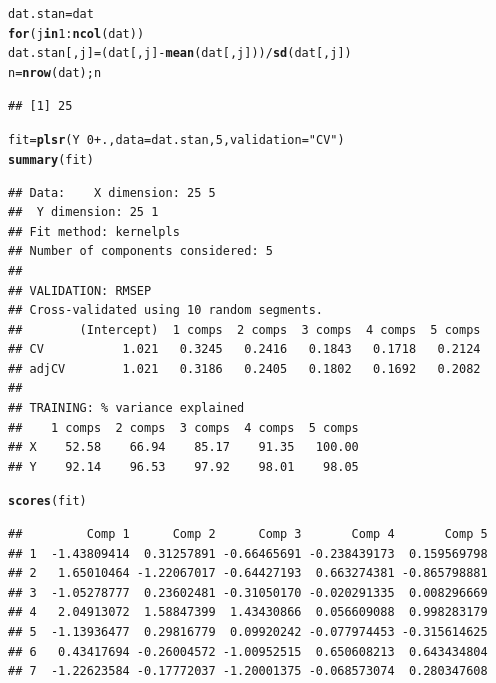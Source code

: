 \documentclass{article}\usepackage[]{graphicx}\usepackage[]{color}
\makeatletter
\newcommand{\hlnum}[1]{\textcolor[rgb]{0.686,0.059,0.569}{#1}}%
\newcommand{\hlstr}[1]{\textcolor[rgb]{0.192,0.494,0.8}{#1}}%
\newcommand{\hlopt}[1]{\textcolor[rgb]{0,0,0}{#1}}%
\newcommand{\hlstd}[1]{\textcolor[rgb]{0.345,0.345,0.345}{#1}}%
\newcommand{\hlkwa}[1]{\textcolor[rgb]{0.161,0.373,0.58}{\textbf{#1}}}%
\newcommand{\hlkwb}[1]{\textcolor[rgb]{0.69,0.353,0.396}{#1}}%
\newcommand{\hlkwc}[1]{\textcolor[rgb]{0.333,0.667,0.333}{#1}}%
\newcommand{\hlkwd}[1]{\textcolor[rgb]{0.737,0.353,0.396}{\textbf{#1}}}%
\newenvironment{kframe}{%
 \def\at@end@of@kframe{}%
 \ifinner\ifhmode%
  \def\at@end@of@kframe{\end{minipage}}%
  \begin{minipage}{\columnwidth}%
 \fi\fi%
 \def\FrameCommand##1{\hskip\@totalleftmargin \hskip-\fboxsep
 \colorbox{shadecolor}{##1}\hskip-\fboxsep
     \hskip-\linewidth \hskip-\@totalleftmargin \hskip\columnwidth}%
 \MakeFramed {\advance\hsize-\width
   \@totalleftmargin\z@ \linewidth\hsize
   \@setminipage}}%
 {\par\unskip\endMakeFramed%
 \at@end@of@kframe}
\newenvironment{knitrout}{}{} %
\makeatother
\begin{document}
\begin{enumerate}[(a)]
\begin{knitrout}
\begin{kframe}
{\ttfamily\noindent\itshape\color{messagecolor}{\#\# \\\#\# Attaching package: 'pls'\\\#\# \\\#\# The following object is masked from 'package:stats':\\\#\# \\\#\#\ \ \ \  loadings}}\begin{alltt}
  \hlstd{dat.stan} \hlkwb{=} \hlstd{dat}
  \hlkwa{for}\hlstd{(j} \hlkwa{in} \hlnum{1}\hlopt{:}\hlkwd{ncol}\hlstd{(dat))}
    \hlstd{dat.stan[,j]} \hlkwb{=} \hlstd{(dat[,j]} \hlopt{-} \hlkwd{mean}\hlstd{(dat[,j]))}\hlopt{/}\hlkwd{sd}\hlstd{(dat[,j])}
  \hlstd{n} \hlkwb{=} \hlkwd{nrow}\hlstd{(dat); n}
\end{alltt}
\begin{verbatim}
## [1] 25
\end{verbatim}
\begin{alltt}
  \hlstd{fit} \hlkwb{=} \hlkwd{plsr}\hlstd{(Y} \hlopt{~}\hlnum{0} \hlopt{+} \hlstd{.,} \hlkwc{data} \hlstd{= dat.stan,} \hlnum{5}\hlstd{,} \hlkwc{validation} \hlstd{=} \hlstr{"CV"}\hlstd{)}
  \hlkwd{summary}\hlstd{(fit)}
\end{alltt}
\begin{verbatim}
## Data: 	X dimension: 25 5 
## 	Y dimension: 25 1
## Fit method: kernelpls
## Number of components considered: 5
## 
## VALIDATION: RMSEP
## Cross-validated using 10 random segments.
##        (Intercept)  1 comps  2 comps  3 comps  4 comps  5 comps
## CV           1.021   0.3245   0.2416   0.1843   0.1718   0.2124
## adjCV        1.021   0.3186   0.2405   0.1802   0.1692   0.2082
## 
## TRAINING: % variance explained
##    1 comps  2 comps  3 comps  4 comps  5 comps
## X    52.58    66.94    85.17    91.35   100.00
## Y    92.14    96.53    97.92    98.01    98.05
\end{verbatim}
\begin{alltt}
  \hlkwd{scores}\hlstd{(fit)}
\end{alltt}
\begin{verbatim}
##         Comp 1      Comp 2      Comp 3       Comp 4       Comp 5
## 1  -1.43809414  0.31257891 -0.66465691 -0.238439173  0.159569798
## 2   1.65010464 -1.22067017 -0.64427193  0.663274381 -0.865798881
## 3  -1.05278777  0.23602481 -0.31050170 -0.020291335  0.008296669
## 4   2.04913072  1.58847399  1.43430866  0.056609088  0.998283179
## 5  -1.13936477  0.29816779  0.09920242 -0.077974453 -0.315614625
## 6   0.43417694 -0.26004572 -1.00952515  0.650608213  0.643434804
## 7  -1.22623584 -0.17772037 -1.20001375 -0.068573074  0.280347608

\end{verbatim}
\end{kframe}
\end{knitrout}
\end{enumerate}
\end{document}
